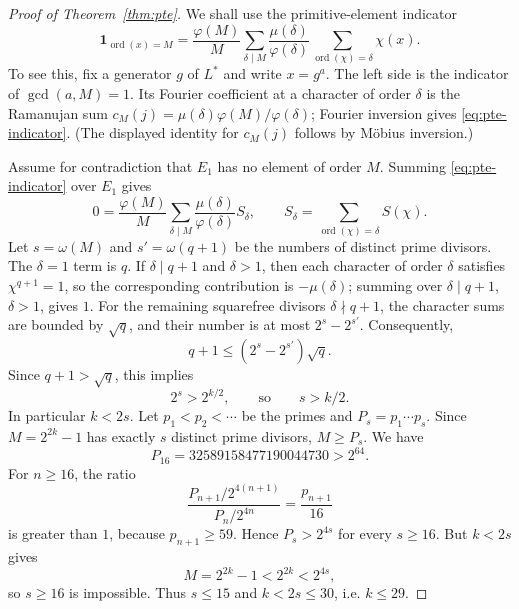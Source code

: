 \documentclass[11pt]{article}
\begin{document}
\begin{proof}[Proof of Theorem~\ref{thm:pte}]
We shall use the primitive-element indicator
\begin{equation}\label{eq:pte-indicator}
\mathbf 1_{\operatorname{ord}(x)=M}
=\frac{\varphi(M)}M
\sum_{\delta\mid M}\frac{\mu(\delta)}{\varphi(\delta)}
\sum_{\operatorname{ord}(\chi)=\delta}\chi(x).
\end{equation}
To see this, fix a generator $g$ of $L^*$ and write $x=g^a$. The left side
is the indicator of $\gcd(a,M)=1$. Its Fourier coefficient at a character
of order $\delta$ is the Ramanujan sum
$c_M(j)=\mu(\delta)\varphi(M)/\varphi(\delta)$; Fourier inversion gives
\eqref{eq:pte-indicator}. (The displayed identity for $c_M(j)$ follows by
M\"obius inversion.)

Assume for contradiction that $E_1$ has no element of order $M$. Summing
\eqref{eq:pte-indicator} over $E_1$ gives
\[
0=\frac{\varphi(M)}M
\sum_{\delta\mid M}\frac{\mu(\delta)}{\varphi(\delta)}S_\delta,
\qquad
S_\delta=\sum_{\operatorname{ord}(\chi)=\delta}S(\chi).
\]
Let $s=\omega(M)$ and $s'=\omega(q+1)$ be the numbers of distinct prime
divisors. The $\delta=1$ term is $q$. If $\delta\mid q+1$ and $\delta>1$,
then each character of order $\delta$ satisfies $\chi^{q+1}=1$, so the
corresponding contribution is $-\mu(\delta)$; summing over
$\delta\mid q+1$, $\delta>1$, gives $1$. For the remaining squarefree
divisors $\delta\nmid q+1$, the character sums are bounded by $\sqrt q$,
and their number is at most $2^s-2^{s'}$. Consequently,
\[
q+1\le(2^s-2^{s'})\sqrt q. \tag{A.2}
\]
Since $q+1>\sqrt q$, this implies
\[
2^s>2^{k/2}, \qquad\text{so}\qquad s>k/2.
\]
In particular $k<2s$. Let $p_1<p_2<\cdots$ be the primes and
$P_s=p_1\cdots p_s$. Since $M=2^{2k}-1$ has exactly $s$ distinct prime
divisors, $M\ge P_s$. We have
\[
P_{16}=32589158477190044730>2^{64}.
\]
For $n\ge16$, the ratio
\[
\frac{P_{n+1}/2^{4(n+1)}}{P_n/2^{4n}}
=\frac{p_{n+1}}{16}
\]
is greater than $1$, because $p_{n+1}\ge59$. Hence $P_s>2^{4s}$ for
every $s\ge16$. But $k<2s$ gives
\[
M=2^{2k}-1<2^{2k}<2^{4s},
\]
so $s\ge16$ is impossible. Thus $s\le15$ and $k<2s\le30$, i.e.
$k\le29$.


\end{proof}
\end{document}
